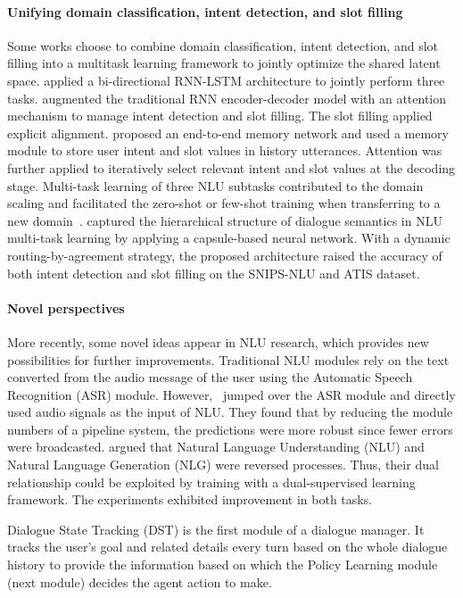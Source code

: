 \paragraph*{Unifying domain classification, intent detection, and slot filling} Some works choose to combine domain classification, intent detection, and slot filling into a multitask learning framework to jointly optimize the shared latent space.  applied a bi-directional RNN-LSTM architecture to jointly perform three tasks.  augmented the traditional RNN encoder-decoder model with an attention mechanism to manage intent detection and slot filling. The slot filling applied explicit alignment.  proposed an end-to-end memory network and used a memory module to store user intent and slot values in history utterances. Attention was further applied to iteratively select relevant intent and slot values at the decoding stage. Multi-task learning of three NLU subtasks contributed to the domain scaling and facilitated the zero-shot or few-shot training when transferring to a new domain~.  captured the hierarchical structure of dialogue semantics in NLU multi-task learning by applying a capsule-based neural network. With a dynamic routing-by-agreement strategy, the proposed architecture raised the accuracy of both intent detection and slot filling on the SNIPS-NLU and ATIS dataset. 
\paragraph*{Novel perspectives} More recently, some novel ideas appear in NLU research, which provides new possibilities for further improvements. Traditional NLU modules rely on the text converted from the audio message of the user using the Automatic Speech Recognition (ASR) module. However,~ jumped over the ASR module and directly used audio signals as the input of NLU. They found that by reducing the module numbers of a pipeline system, the predictions were more robust since fewer errors were broadcasted.  argued that Natural Language Understanding (NLU) and Natural Language Generation (NLG) were reversed processes. Thus, their dual relationship could be exploited by training with a dual-supervised learning framework. The experiments exhibited improvement in both tasks.

\label{Dialogue State Tracking }
Dialogue State Tracking (DST) is the first module of a dialogue manager. It tracks the user's goal and related details every turn based on the whole dialogue history to provide the information based on which the Policy Learning module (next module) decides the agent action to make. 
